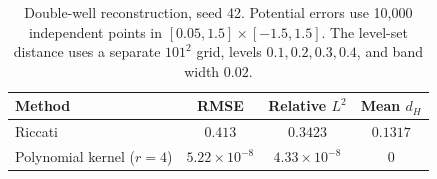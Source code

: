 \begin{table}[htbp]\centering
\caption{Double-well reconstruction, seed 42. Potential errors use 10,000 independent points in $[0.05,1.5]\times[-1.5,1.5]$. The level-set distance uses a separate $101^2$ grid, levels $0.1,0.2,0.3,0.4$, and band width $0.02$.}\label{tab:example2_errors}
\begin{tabular}{lccc}\toprule Method & RMSE & Relative $L^2$ & Mean $d_H$\\\midrule
Riccati & $0.413$ & $0.3423$ & $0.1317$ \\
Polynomial kernel ($r=4$) & $5.22\times10^{-8}$ & $4.33\times10^{-8}$ & $0$ \\\bottomrule\end{tabular}\end{table}
